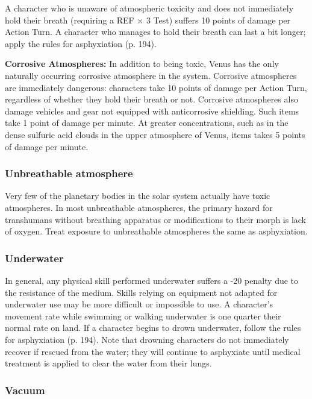 A character who is unaware of atmospheric toxicity and does not immediately hold their breath (requiring a REF $\times$ 3 Test) suffers 10 points of damage per Action Turn. A character who manages to hold their breath can last a bit longer; apply the rules for asphyxiation (p. 194). 

\textbf{Corrosive Atmospheres:} In addition to being toxic, Venus has the only naturally occurring corrosive atmosphere in the system. Corrosive atmospheres are immediately dangerous: characters take 10 points of damage per Action Turn, regardless of whether they hold their breath or not. Corrosive atmospheres also damage vehicles and gear not equipped with anticorrosive shielding. Such items take 1 point of damage per minute. At greater concentrations, such as in the dense sulfuric acid clouds in the upper atmosphere of Venus, items takes 5 points of damage per minute. 

\subsubsection{Unbreathable atmosphere} 

Very few of the planetary bodies in the solar system actually have toxic atmospheres. In most unbreathable atmospheres, the primary hazard for transhumans without breathing apparatus or modifications to their morph is lack of oxygen. Treat exposure to unbreathable atmospheres the same as asphyxiation. 

\subsubsection{Underwater} 

In general, any physical skill performed underwater suffers a -20 penalty due to the resistance of the medium. Skills relying on equipment not adapted for underwater use may be more difficult or impossible to use. A character’s movement rate while swimming or walking underwater is one quarter their normal rate on land. If a character begins to drown underwater, follow the rules for asphyxiation (p. 194). Note that drowning characters do not immediately recover if rescued from the water; they will continue to asphyxiate until medical treatment is applied to clear the water from their lungs. 

\subsubsection{Vacuum} 

